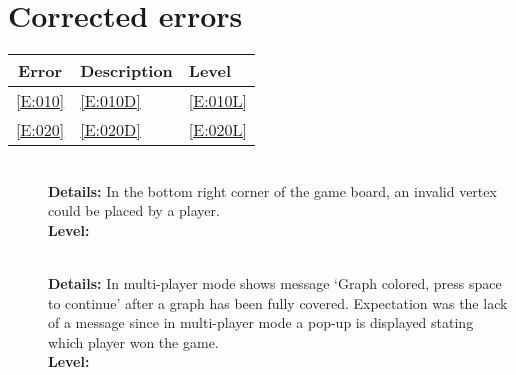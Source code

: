 \section{Corrected errors}
\label{section:corrected-errors}

\begin{tabular}{cll}

\hline
	\textbf{Error} & \textbf{Description} & \textbf{Level} \\
	\hline
	\ref{E:010} & \ref{E:010D} & \ref{E:010L} \\
	\ref{E:020} & \ref{E:020D} & \ref{E:020L} \\
	\hline
\end{tabular}

\begin{description}
	\item[] \textbf{} \\
	\textbf{Details:} In the bottom right corner of the \twixt game board, an invalid vertex could be placed by a player. \\
	\textbf{Level:} 

	\item[] \textbf{} \\
	\textbf{Details:} In multi-player mode \graphcoloring shows message `Graph colored, press space to continue' after a graph has been fully covered. Expectation was the lack of a message since in multi-player mode a pop-up is displayed stating which player won the game. \\
	\textbf{Level:} 
\end{description}

